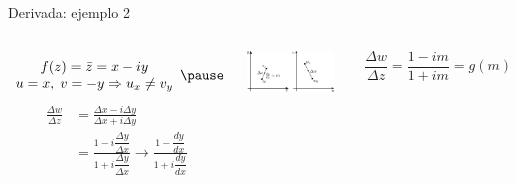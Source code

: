 \documentclass[9pt, aspectratio=169]{beamer}
\begin{document}
\begin{frame}{Derivada: ejemplo 2}
	\begin{columns}[c]
		\[
			\begin{array}{c}
				f(z) = \bar{z} = x - i y \\
				u = x, \; v = -y \Rightarrow u_x \neq v_y
			\end{array} \pause
		\] \vspace{1em}
		\begin{align*}
			\frac{\Delta w}{\Delta z} & = \frac{\Delta x - i \Delta y}{\Delta x + i \Delta y}                                                                                   \\
			                          & = \frac{1 - i \dfrac{\Delta y}{\Delta x}}{1 + i \dfrac{\Delta y}{\Delta x}} \rightarrow \frac{1 - \dfrac{dy}{dx}}{1 + i \dfrac{dy}{dx}}
		\end{align*} \pause

		\includegraphics[width=0.9\textwidth]{figs/fig-05}

		\[ \frac{\Delta w}{\Delta z} = \frac{1 - im}{1 + im} = g(m) \]
	\end{columns}
\end{frame}
\end{document}
